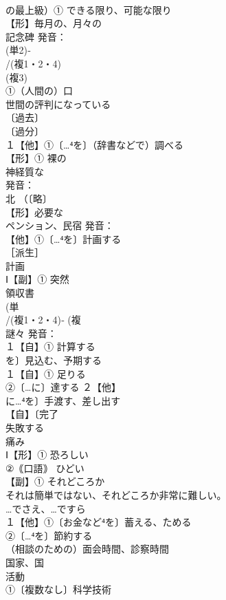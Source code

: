 \documentclass[8pt]{extreport}
\begin{document}
\begin{CJK}{UTF8}{min}
\\	の最上級）① できる限り、可能な限り
\\	【形】毎月の、月々の 
\\	記念碑 発音：
\\	(単2)‐
\\	/(複1・2・4)
\\	(複3)
\\	①（人間の）口 
\\	世間の評判になっている
\\	〔過去〕
\\	〔過分〕
\\	１【他】①〔…⁴を〕（辞書などで）調べる 
\\	【形】① 裸の 
\\	神経質な 
\\	発音：
\\	北 （〔略〕
\\	【形】必要な 
\\	ペンション、民宿 発音：
\\	【他】①〔…⁴を〕計画する 
\\	［派生］ 
\\	計画
\\	Ⅰ【副】① 突然 
\\	領収書 
\\	(単
\\	/(複1・2・4)‐ (複
\\	謎々 発音：
\\	１【自】① 計算する 
\\	を〕見込む、予期する
\\	１【自】① 足りる 
\\	②〔…に〕達する ２【他】
\\	に…⁴を〕手渡す、差し出す
\\	【自】〔完了
\\	失敗する 
\\	痛み 
\\	Ⅰ【形】① 恐ろしい 
\\	②｟口語｠ ひどい 
\\	【副】① それどころか 
\\	それは簡単ではない、それどころか非常に難しい。 
\\	…でさえ、…ですら
\\	１【他】①〔お金など⁴を〕蓄える、ためる 
\\	②〔…⁴を〕節約する 
\\	（相談のための）面会時間、診察時間
\\	国家、国 
\\	活動 
\\	①〔複数なし〕科学技術 

\end{CJK}
\end{document}

